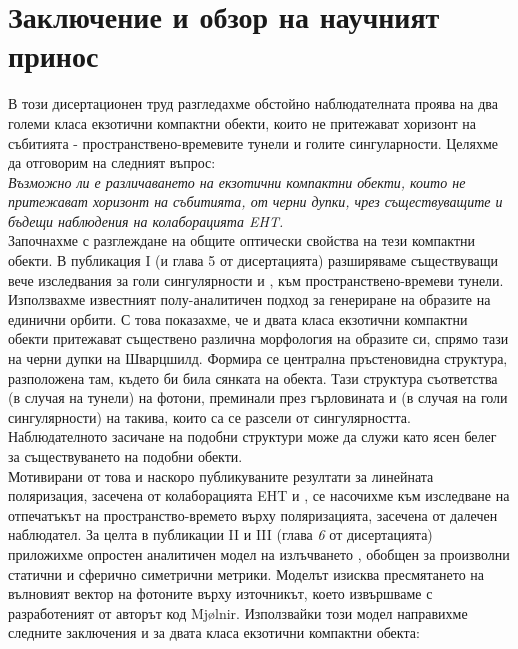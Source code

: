 \documentclass[12pt]{article}
\numberwithin{equation}{section}
\numberwithin{figure}{section}
\begin{document}
\section{Заключение и обзор на научният принос}
	
	
	В този дисертационен труд разгледахме обстойно наблюдателната проява на два големи класа екзотични компактни обекти, които не притежават хоризонт на събитията - пространствено-времевите тунели и голите сингуларности. Целяхме да отговорим на следният въпрос:\\
	
	\emph{Възможно ли е различаването на екзотични компактни обекти, които не притежават хоризонт на събитията, от черни дупки, чрез съществуващите и бъдещи наблюдения на колаборацията EHT.}\\
	
	Започнахме с разглеждане на общите оптически свойства на тези компактни обекти. В публикация I (и глава 5 от дисертацията) разширяваме съществуващи вече изследвания за голи сингулярности \cite{Gyulchev2020} и \cite{Gyulchev2021}, към пространствено-времеви тунели. Използвахме известният полу-аналитичен подход \cite{Muller2009} за генериране на образите на единични орбити. С това показахме, че и двата класа екзотични компактни обекти притежават съществено различна морфология на образите си, спрямо тази на черни дупки на Шварцшилд. Формира се централна пръстеновидна структура, разположена там, където би била сянката на обекта. Тази структура съответства (в случая на тунели) на фотони, преминали през гърловината и (в случая на голи сингулярности) на такива, които са се разсели от сингулярността. Наблюдателното засичане на подобни структури може да служи като ясен белег за съществуването на подобни обекти.\\
	
	Мотивирани от това и наскоро публикуваните резултати за линейната поляризация, засечена от колаборацията EHT \cite{EHT_M87_VII} и \cite{EHT_M87_VIII}, се насочихме към изследване на отпечатъкът на пространство-времето върху поляризацията, засечена от далечен наблюдател. За целта в публикации II и III (глава \emph{6} от дисертацията) приложихме опростен аналитичен модел на излъчването \cite{Narayan2021}, обобщен за произволни статични и сферично симетрични метрики. Моделът изисква пресмятането на вълновият вектор на фотоните върху източникът, което извършваме с разработеният от авторът код Mjølnir. Използвайки този модел направихме следните заключения и за двата класа екзотични компактни обекта:\\
	
\end{document}
